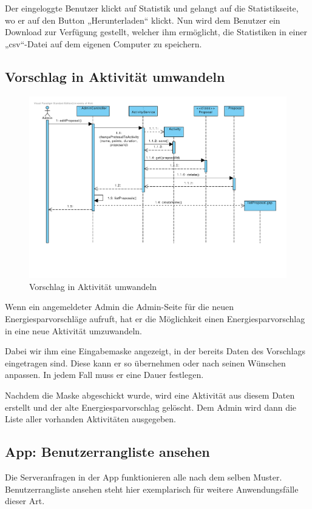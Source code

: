 Der eingeloggte Benutzer klickt auf Statistik und gelangt auf die
Statistikseite, wo er auf den Button „Herunterladen“ klickt. Nun wird
dem Benutzer ein Download zur Verfügung gestellt, welcher ihm
ermöglicht, die Statistiken in einer „csv“-Datei auf dem eigenen
Computer zu speichern.

\subsection{Vorschlag in Aktivität umwandeln}

\begin{figure}[H]
  \centering
  \includegraphics[width=\textwidth, clip]{gfx/vorschlag_in_aktivitaet_umwandeln}
  \caption{Vorschlag in Aktivität umwandeln}
\end{figure}

Wenn ein angemeldeter Admin die Admin-Seite für die neuen Energiesparvorschläge aufruft, hat er die Möglichkeit einen Energiesparvorschlag in eine neue Aktivität umzuwandeln.

Dabei wir ihm eine Eingabemaske angezeigt, in der bereits Daten des Vorschlags eingetragen sind. Diese kann er so übernehmen oder nach seinen Wünschen anpassen. In jedem Fall muss er eine Dauer festlegen.

Nachdem die Maske abgeschickt wurde, wird eine Aktivität aus diesem Daten erstellt und der alte Energiesparvorschlag gelöscht. Dem Admin wird dann die Liste aller vorhanden Aktivitäten ausgegeben.



\subsection{App: Benutzerrangliste ansehen}
Die Serveranfragen in der App funktionieren alle nach dem selben
Muster. Benutzerrangliste ansehen steht hier exemplarisch für weitere
Anwendungsfälle dieser Art.

